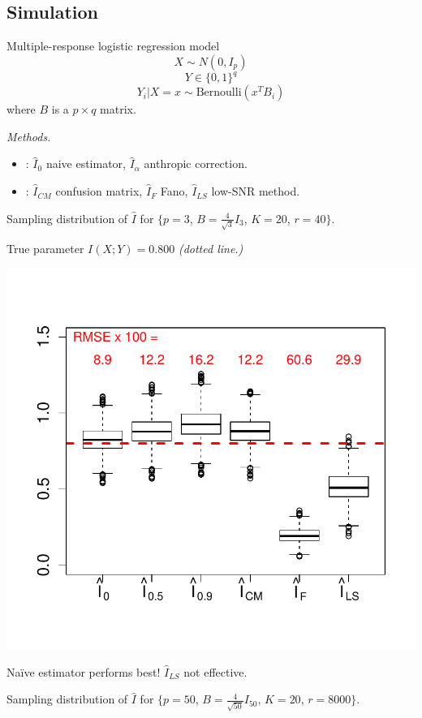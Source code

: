 \documentclass[12pt]{article}
\begin{document}
\subsection{Simulation}

Multiple-response logistic regression model
\[
X \sim N(0, I_p)
\]
\[
Y \in \{0,1\}^q
\]
\[
Y_i|X = x \sim \text{Bernoulli}(x^T B_i)
\]
where $B$ is a $p \times q$ matrix.

\emph{Methods.}
\begin{itemize}
\item {}: $\hat{I}_0$ naive estimator, $\hat{I}_\alpha$ anthropic correction.
\item {}: $\hat{I}_{CM}$ confusion matrix, $\hat{I}_F$ Fano, $\hat{I}_{LS}$ low-SNR method.
\end{itemize}

Sampling distribution of $\hat{I}$ for \small{$\{p = 3$, $B = \frac{4}{\sqrt{3}} I_3$, $K = 20$, $r = 40\}$.}

True parameter $I(X; Y) = 0.800$ \emph{(dotted line.)}
\begin{center}
\includegraphics[scale = 0.5, clip = true, trim = 0 0.5in 0 0.5in]{../info_theory_sims/fig1.pdf}
\end{center}
Na\"{i}ve estimator performs best!  $\hat{I}_{LS}$ not effective.

Sampling distribution of $\hat{I}$ for \small{$\{p = 50$, $B = \frac{4}{\sqrt{50}} I_{50}$, $K = 20$, $r = 8000\}$.}
\end{document}
